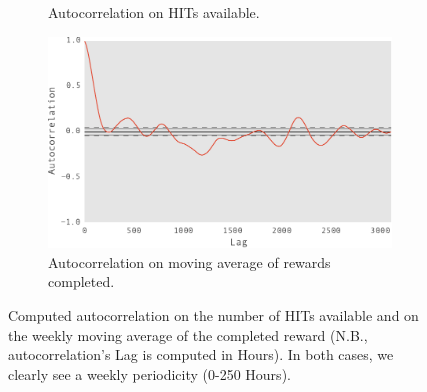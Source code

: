 \begin{figure}[t!]
\begin{subfigure}[b]{0.48\textwidth}
        \caption{Autocorrelation on HITs available.}
        \label{fig:achitav}
    \end{subfigure}
    \hfill
    \begin{subfigure}[b]{0.48\textwidth}
        \centering
        \includegraphics[width=\textwidth]{figures/macac}
        \caption{Autocorrelation on moving average of rewards completed.}
        \label{fig:acmac}
    \end{subfigure}
       
	\caption{Computed autocorrelation on the number of HITs available and on the weekly moving average of the completed reward (N.B., autocorrelation's Lag is computed in Hours). In both cases, we clearly see a weekly periodicity (0-250 Hours).}
	\label{fig:autocorrelation2}
\end{figure}

